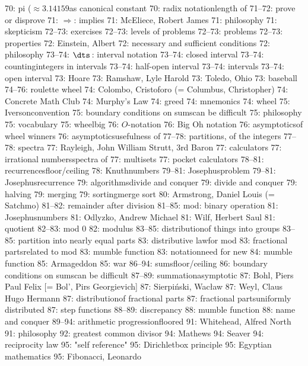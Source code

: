  70: pi ($\approx3.14159$\sub as canonical constant
 70: radix notation\sub length of
 71--72: prove or disprove
 71: $\Longrightarrow$: implies
 71: McEliece, Robert James
 71: philosophy
 71: skepticism
 72--73: exercises
 72--73: levels of problems
 72--73: problems
 72--73: properties
 72: Einstein, Albert
 72: necessary and sufficient conditions
 72: philosophy
 73--74: $\dts\,$: interval notation
 73--74: closed interval
 73--74: counting\sub integers in intervals
 73--74: half-open interval
 73--74: intervals
 73--74: open interval
 73: Hoare
 73: Ramshaw, Lyle Harold
 73: Toledo, Ohio
 73: baseball
 74--76: roulette wheel
 74: Colombo, Cristoforo (= Columbus, Christopher)
 74: Concrete Math Club
 74: Murphy's Law
 74: greed
 74: mnemonics
 74: wheel
 75: Iverson\sub convention
 75: boundary conditions on sums\sub can be difficult
 75: philosophy
 75: vocabulary
 75: wheel\sub big
 76: $O$-notation
 76: Big Oh notation
 76: asymptotics\sub of wheel winners
 76: asymptotics\sub usefulness of
 77--78: partitions, of the integers
 77--78: spectra
 77: Rayleigh, John William Strutt, 3rd Baron
 77: calculators
 77: irrational numbers\sub spectra of
 77: multisets
 77: pocket calculators
 78--81: recurrences\sub floor/ceiling
 78: Knuth\sub numbers
 79--81: Josephus\sub problem
 79--81: Josephus\sub recurrence
 79: algorithms\sub divide and conquer
 79: divide and conquer
 79: halving
 79: merging
 79: sorting\sub merge sort
 80: Armstrong, Daniel Louis (= Satchmo)
 81--82: remainder after division
 81--85: mod: binary operation
 81: Josephus\sub numbers
 81: Odlyzko, Andrew Michael
 81: Wilf, Herbert Saul
 81: quotient
 82--83: mod $0$
 82: modulus
 83--85: distribution\sub of things into groups
 83--85: partition into nearly equal parts
 83: distributive law\sub for mod
 83: fractional parts\sub related to mod
 83: mumble function
 83: notation\sub need for new
 84: mumble function
 85: Armageddon
 85: war
 86--94: sums\sub floor/ceiling
 86: boundary conditions on sums\sub can be difficult
 87--89: summation\sub asymptotic
 87: Bohl, Piers Paul Felix [= Bol', Pirs Georgievich]
 87: Sierpi\'nski, Wac{\l}aw
 87: Weyl, Claus Hugo Hermann
 87: distribution\sub of fractional parts
 87: fractional parts\sub uniformly distributed
 87: step functions
 88--89: discrepancy
 88: mumble function
 88: name and conquer
 89--94: arithmetic progression\sub floored
 91: Whitehead, Alfred North
 91: philosophy
 92: greatest common divisor
 94: Mathews
 94: Seaver
 94: reciprocity law
 95: "self reference"
 95: Dirichlet\sub box principle
 95: Egyptian mathematics
 95: Fibonacci, Leonardo
